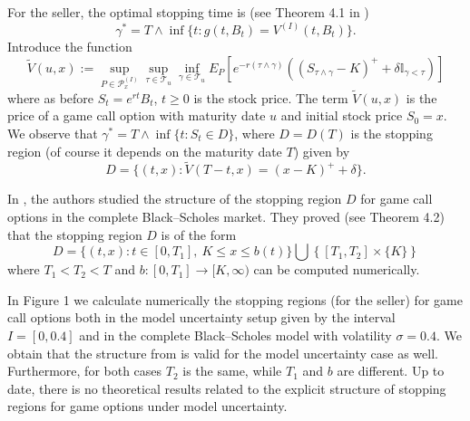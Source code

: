 \documentclass{amsart}
\numberwithin{equation}{section}
\begin{document}
For the seller, the optimal stopping time is (see Theorem 4.1 in \cite{BY})
$$\gamma^{*}=T\wedge\inf\{t: g(t,B_t)=V^{(I)}(t,B_t)\}.$$
Introduce the function
$$\tilde V(u,x):=\sup_{P\in \mathcal{P}^{(I)}_x}\sup_{\tau\in\mathcal T_{u}}\inf_{\gamma\in\mathcal T_{u}}
E_{P}\left[e^{-r(\tau\wedge\gamma)}\left((S_{\tau\wedge\gamma}-K)^{+}+\delta\mathbb{I}_{\gamma<\tau}\right)\right]
$$
where as before $S_t=e^{rt} B_t$, $t\geq 0$ is the stock price. The term $\tilde V(u,x)$
is the price of a game call option with maturity date $u$ and initial stock price $S_0=x$.
We observe that
$\gamma^{*}=T\wedge\inf\{t: S_t\in D\}$, where $D=D(T)$ is the stopping region (of course it depends on the maturity date $T$) given by
$$D=\{(t,x): \tilde V(T-t,x)=(x-K)^{+}+\delta\}.$$

In \cite{YYZ}, the authors studied the structure of the stopping region $D$ for game call options in the complete Black--Scholes market.
They proved (see Theorem 4.2) that the stopping region $D$ is of the form
$$D=\{(t,x): t\in [0,T_1], \ K\leq x\leq b(t)\}\bigcup \left\{[T_1,T_2]\times\{K\}\right\}$$
where $T_1<T_2<T$ and $b:[0,T_1]\rightarrow [K,\infty)$ can be computed numerically.

In Figure 1 we calculate numerically the stopping regions (for the seller)
for game call options both in the model uncertainty setup given by the interval $I=[0,0.4]$
and in the complete Black--Scholes model with volatility $\sigma=0.4$.
We obtain that the structure from \cite{YYZ} is valid for the model uncertainty case as well.
Furthermore, for both cases $T_2$ is the same, while $T_1$ and $b$ are different.
Up to date, there is no theoretical results related to the explicit structure of
stopping regions for game options under model uncertainty.
\end{document}
